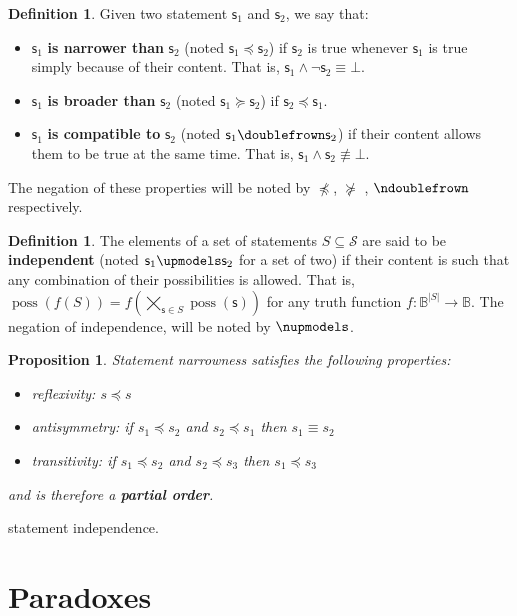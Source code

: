 \documentclass[letterpaper]{article}
\theoremstyle{plain}%
\newtheorem{prop}[thrm]{Proposition}
\theoremstyle{definition}
\newtheorem{defn}[thrm]{Definition}
\theoremstyle{remark}
\DeclareMathOperator{\possFn}{poss}
\def\contradiction{\bot}
\def\comp{\doublefrown}
\def\ncomp{\ndoublefrown}
\def\narrower{\preccurlyeq}
\def\nnarrower{\npreccurlyeq}
\def\broader{\succcurlyeq}
\def\nbroader{\nsucccurlyeq}
\def\indep{\upmodels}
\def\nindep{\nupmodels}
\def\AND{\wedge}
\def\NOT{\neg}
\newcommand{\stmt}[1][s] {\mathsf{#1}}
\begin{document}
\begin{defn}
	Given two statement $\stmt_1$ and $\stmt_2$, we say that:
	\begin{itemize}
		\item $\stmt_1$ \textbf{is narrower than} $\stmt_2$ (noted $\stmt_1 \narrower \stmt_2$) if $\stmt_2$ is true whenever $\stmt_1$ is true simply because of their content. That is, $\stmt_1 \AND \NOT \stmt_2 \equiv \contradiction$.
		\item $\stmt_1$ \textbf{is broader than} $\stmt_2$ (noted $\stmt_1 \broader \stmt_2$) if $\stmt_2 \narrower \stmt_1$.
		\item $\stmt_1$ \textbf{is compatible to} $\stmt_2$ (noted $\stmt_1 \comp \stmt_2$) if their content allows them to be true at the same time. That is, $\stmt_1 \AND \stmt_2 \nequiv \contradiction$.
		
	\end{itemize}
	The negation of these properties will be noted by $\nnarrower$, $\nbroader$ , $\ncomp$ respectively.
\end{defn}
\begin{defn}
	The elements of a set of statements $S \subseteq \mathcal{S}$ are said to be \textbf{independent} (noted $\stmt_1 \indep \stmt_2$ for a set of two) if their content is such that any combination of their possibilities is allowed. That is, $\possFn(f(S)) = f(\bigtimes\limits_{\stmt \in S} \possFn(\stmt))$ for any truth function $f : \mathbb{B}^{|S|} \to \mathbb{B}$. The negation of independence, will be noted by $\nindep$.
\end{defn}

\begin{prop}
	Statement narrowness satisfies the following properties:
	\begin{itemize}
		\item reflexivity: $s \narrower s$
		\item antisymmetry: if $s_1 \narrower s_2$ and  $s_2 \narrower s_1$ then $s_1 \equiv s_2$
		\item transitivity: if $s_1 \narrower s_2$ and $s_2 \narrower s_3$ then $s_1 \narrower s_3$
	\end{itemize}
	and is therefore a \textbf{partial order}.
\end{prop}
statement independence.

\section{Paradoxes}
\end{document}
